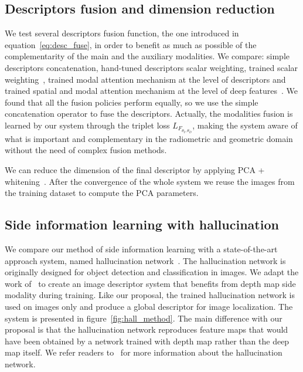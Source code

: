 \subsection{Descriptors fusion and dimension reduction}
\label{subsec:fuse_desc}
We test several descriptors fusion function, the one introduced in equation~\ref{eq:desc_fuse}, in order to benefit as much as possible of the complementarity of the main and the auxiliary modalities. We compare: simple descriptors concatenation, hand-tuned descriptors scalar weighting, trained scalar weighting~\cite{Sizikova2016}, trained modal attention mechanism at the level of descriptors and trained spatial and modal attention mechanism at the level of deep features~\cite{Seymour2018}. We found that all the fusion policies perform equally, so we use the simple concatenation operator to fuse the descriptors. Actually, the modalities fusion is learned by our system through the triplet loss $L_{F_{\theta_{I}, \theta_{D}}}$, making the system aware of what is important and complementary in the radiometric and geometric domain without the need of complex fusion methods.

We can reduce the dimension of the final descriptor by applying PCA + whitening~\cite{Arandjelovic2017, Radenovic2017, Gordo2017}. After the convergence of the whole system we reuse the images from the training dataset to compute the PCA parameters.

\subsection{Side information learning with hallucination}
\label{subsec:hall}
We compare our method of side information learning with a state-of-the-art approach system, named hallucination network~\cite{Hoffman2016}. The hallucination network is originally designed for object detection and classification in images. We adapt the work of~\cite{Hoffman2016} to create an image descriptor system that benefits from depth map side modality during training. Like our proposal, the trained hallucination network is used on images only and produce a global descriptor for image localization. The system is presented in figure~\ref{fig:hall_method}. The main difference with our proposal is that the hallucination network reproduces feature maps that would have been obtained by a network trained with depth map rather than the deep map itself. We refer readers to~\cite{Hoffman2016} for more information about the hallucination network.

